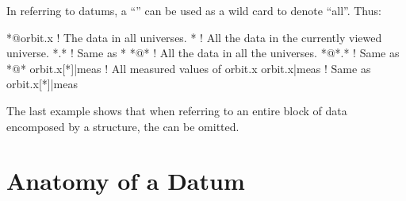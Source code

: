 In referring to datums, a ``\vn{*}'' can be used as a wild card to 
denote ``all''. Thus:
\begin{example}
  *@orbit.x       ! The  data in all universes.
  *               ! All the data in the currently viewed universe.
  *.*             ! Same as *
  *@*             ! All the data in all the universes. 
  *@*.*           ! Same as *@*
  orbit.x[*]|meas ! All measured values of orbit.x
  orbit.x|meas    ! Same as orbit.x[*]|meas
\end{example}
The last example shows that when referring to an entire block of data
encomposed by a  structure, the \vn{[*]} can be omitted.

\section{Anatomy of a Datum}
\label{s:data.anatomy}

